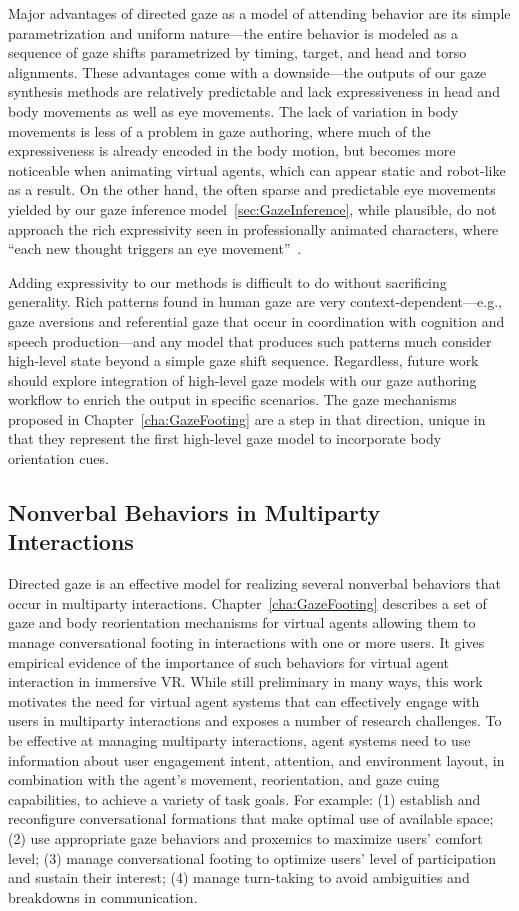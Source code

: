 Major advantages of directed gaze as a model of attending behavior are its simple parametrization and uniform nature---the entire behavior is modeled as a sequence of gaze shifts parametrized by timing, target, and head and torso alignments. These advantages come with a downside---the outputs of our gaze synthesis methods are relatively predictable and lack expressiveness in head and body movements as well as eye movements. The lack of variation in body movements is less of a problem in gaze authoring, where much of the expressiveness is already encoded in the body motion, but becomes more noticeable when animating virtual agents, which can appear static and robot-like as a result.
On the other hand, the often sparse and predictable eye movements yielded by our gaze inference model~\ref{sec:GazeInference}, while plausible, do not approach the rich expressivity seen in professionally animated characters, where ``each new thought triggers an eye movement''~\citep{maestri2001digital}.

Adding expressivity to our methods is difficult to do without sacrificing generality. Rich patterns found in human gaze are very context-dependent---e.g., gaze aversions and referential gaze that occur in coordination with cognition and speech production---and any model that produces such patterns much consider high-level state beyond a simple gaze shift sequence.
Regardless, future work should explore integration of high-level gaze models with our gaze authoring workflow to enrich the output in specific scenarios. The gaze mechanisms proposed in Chapter~\ref{cha:GazeFooting} are a step in that direction, unique in that they represent the first high-level gaze model to incorporate body orientation cues.

\subsection{Nonverbal Behaviors in Multiparty Interactions}

Directed gaze is an effective model for realizing several nonverbal behaviors that occur in multiparty interactions. Chapter~\ref{cha:GazeFooting} describes a set of gaze and body reorientation mechanisms for virtual agents allowing them to manage conversational footing in interactions with one or more users. It gives empirical evidence of the importance of such behaviors for virtual agent interaction in immersive VR. While still preliminary in many ways, this work motivates the need for virtual agent systems that can effectively engage with users in multiparty interactions and exposes a number of research challenges. To be effective at managing multiparty interactions, agent systems need to use information about user engagement intent, attention, and environment layout, in combination with the agent's movement, reorientation, and gaze cuing capabilities, to achieve a variety of task goals. For example: (1) establish and reconfigure conversational formations that make optimal use of available space; (2) use appropriate gaze behaviors and proxemics to maximize users' comfort level; (3) manage conversational footing to optimize users' level of participation and sustain their interest; (4) manage turn-taking to avoid ambiguities and breakdowns in communication.

